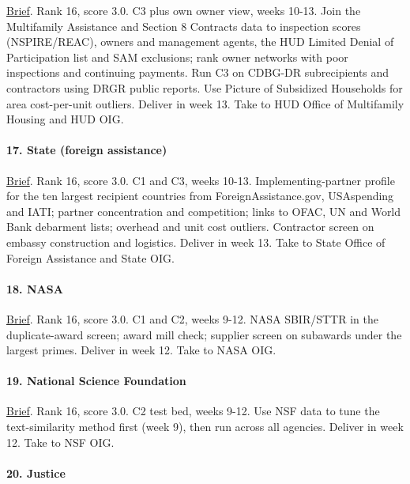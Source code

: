 \documentclass[letterpaper,11pt]{article}
\begin{document}
\href{agencies/hud.pdf}{Brief}. Rank 16, score 3.0. C3 plus own owner
view, weeks 10-13. Join the Multifamily Assistance and Section 8
Contracts data to inspection scores (NSPIRE/REAC), owners and management
agents, the HUD Limited Denial of Participation list and SAM exclusions;
rank owner networks with poor inspections and continuing payments. Run
C3 on CDBG-DR subrecipients and contractors using DRGR public reports.
Use Picture of Subsidized Households for area cost-per-unit outliers.
Deliver in week 13. Take to HUD Office of Multifamily Housing and HUD
OIG.

\hypertarget{state-foreign-assistance}{%
\paragraph{17. State (foreign
assistance)}\label{state-foreign-assistance}}

\href{agencies/state.pdf}{Brief}. Rank 16, score 3.0. C1 and C3, weeks
10-13. Implementing-partner profile for the ten largest recipient
countries from ForeignAssistance.gov, USAspending and IATI; partner
concentration and competition; links to OFAC, UN and World Bank
debarment lists; overhead and unit cost outliers. Contractor screen on
embassy construction and logistics. Deliver in week 13. Take to State
Office of Foreign Assistance and State OIG.

\hypertarget{nasa}{%
\paragraph{18. NASA}\label{nasa}}

\href{agencies/nasa.pdf}{Brief}. Rank 16, score 3.0. C1 and C2, weeks
9-12. NASA SBIR/STTR in the duplicate-award screen; award mill check;
supplier screen on subawards under the largest primes. Deliver in week
12. Take to NASA OIG.

\hypertarget{national-science-foundation}{%
\paragraph{19. National Science
Foundation}\label{national-science-foundation}}

\href{agencies/nsf.pdf}{Brief}. Rank 16, score 3.0. C2 test bed, weeks
9-12. Use NSF data to tune the text-similarity method first (week 9),
then run across all agencies. Deliver in week 12. Take to NSF OIG.

\hypertarget{justice}{%
\paragraph{20. Justice}\label{justice}}
\end{document}
